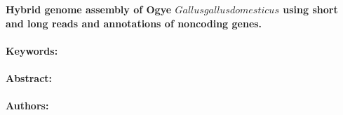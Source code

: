 \noindent
\large {\bf Hybrid genome assembly of Ogye \(Gallus gallus domesticus\) using short and long reads and annotations of noncoding genes.} 


\normalsize 


\noindent \paragraph{Keywords:} 

\noindent \paragraph{Abstract:} 



\noindent \paragraph{Authors:} 

